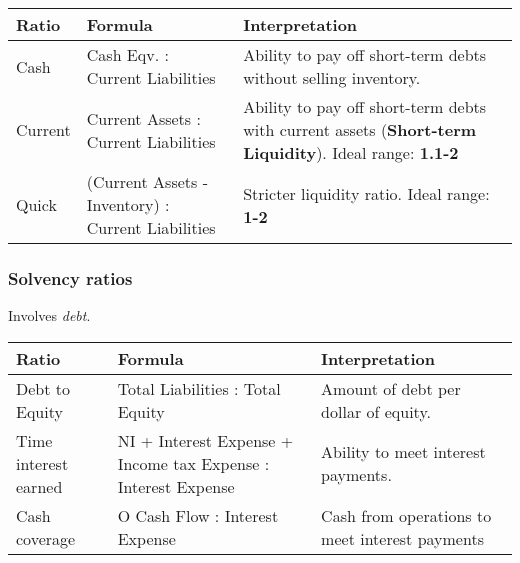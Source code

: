 \begin{table}[H]
    \centering
    \begin{tabular}{p{}p{}p{}}
        \hline
        \textbf{Ratio} & \textbf{Formula}                                   & \textbf{Interpretation}                                                                                              \\
        \hline
        Cash           & Cash Eqv. : Current Liabilities                    & Ability to pay off short-term debts without selling inventory.                                                       \\
        \hline
        Current        & Current Assets : Current Liabilities               & Ability to pay off short-term debts with current assets (\textbf{Short-term Liquidity}). Ideal range: \textbf{1.1-2} \\
        \hline
        Quick          & (Current Assets - Inventory) : Current Liabilities & Stricter liquidity ratio. Ideal range: \textbf{1-2}                                                                  \\
        \hline
    \end{tabular}
\end{table}

\subsubsection{Solvency ratios}

Involves \textit{debt}.

\begin{table}[H]
    \centering
    \begin{tabular}{p{}p{}p{}}
        \hline
        \textbf{Ratio}       & \textbf{Formula}                                              & \textbf{Interpretation}                        \\
        \hline
        Debt to Equity       & Total Liabilities : Total Equity                              & Amount of debt per dollar of equity.           \\
        \hline
        Time interest earned & NI + Interest Expense + Income tax Expense : Interest Expense & Ability to meet interest payments.             \\
        \hline
        Cash coverage        & O Cash Flow : Interest Expense                                & Cash from operations to meet interest payments \\
        \hline
    \end{tabular}
\end{table}

